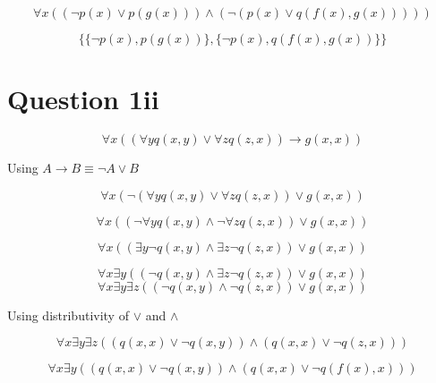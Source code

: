 \documentclass[10pt,a4paper]{article}
\begin{document}
\begin{equation}
 \forall x ((\neg p(x) \vee p(g(x)))\wedge(\neg (p(x) \vee q(f(x),g(x)))))
\end{equation}

\begin{equation}
 \{\{\neg p(x),p(g(x))\},\{\neg p(x),q(f(x),g(x))\}\}
\end{equation}



\section{Question 1ii}

\begin{equation}
 \forall x ((\forall y q(x,y) \vee \forall z q(z,x))\rightarrow g(x,x))
\end{equation}

Using $A\rightarrow B \equiv \neg A \vee B$

\begin{equation}
 \forall x (\neg(\forall y q(x,y) \vee \forall z q(z,x))\vee g(x,x))
\end{equation}


\begin{equation}
 \forall x ((\neg\forall y q(x,y) \wedge \neg \forall z q(z,x))\vee g(x,x))
\end{equation}

\begin{equation}
 \forall x (( \exists y \neg q(x,y) \wedge  \exists z \neg q(z,x))\vee g(x,x))
\end{equation}

\begin{equation}
 \forall x \exists y((  \neg q(x,y) \wedge  \exists z \neg q(z,x))\vee g(x,x))
\end{equation}
\begin{equation}
 \forall x \exists y\exists z((  \neg q(x,y) \wedge   \neg q(z,x))\vee g(x,x))
\end{equation}


Using distributivity of $\vee$ and $\wedge$


\begin{equation}
 \forall x \exists y\exists z(( q(x,x) \vee \neg q(x,y))\wedge (q(x,x) \vee \neg q(z,x)))
\end{equation}


\begin{equation}
 \forall x \exists y(( q(x,x) \vee \neg q(x,y))\wedge (q(x,x) \vee \neg q(f(x),x)))
\end{equation}
\end{document}
